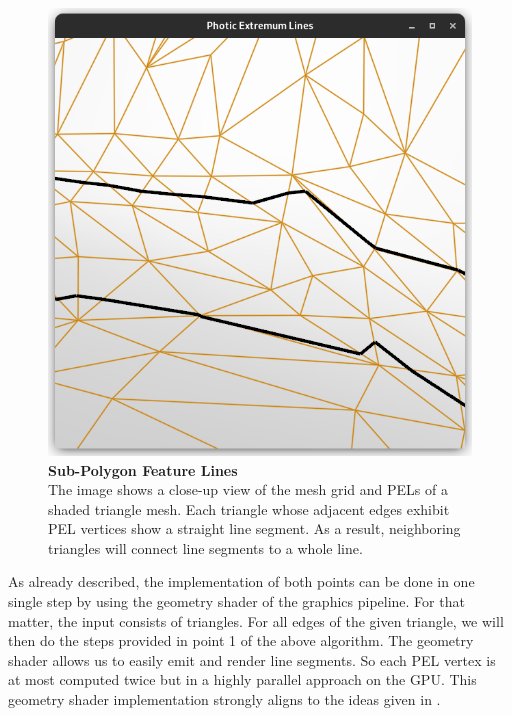 \documentclass[9pt,fleqn,twoside,twocolumn]{stdglobal}
\begin{document}
    \begin{figure}[t]
      \centering
      \includegraphics[width=0.8\linewidth,trim={15px 15 15 50},clip]{images/subpolygon-lines.png}
      \caption{%
        \textbf{Sub-Polygon Feature Lines}\\
        The image shows a close-up view of the mesh grid and PELs of a shaded triangle mesh.
        Each triangle whose adjacent edges exhibit PEL vertices show a straight line segment.
        As a result, neighboring triangles will connect line segments to a whole line.
      }
      \label{fig:subpolygon-feature-lines}
    \end{figure}

    As already described, the implementation of both points can be done in one single step by using the geometry shader of the graphics pipeline.
    For that matter, the input consists of triangles.
    For all edges of the given triangle, we will then do the steps provided in point 1 of the above algorithm.
    The geometry shader allows us to easily emit and render line segments.
    So each PEL vertex is at most computed twice but in a highly parallel approach on the GPU.
    This geometry shader implementation strongly aligns to the ideas given in \textcite{zhang2010}.
\end{document}
